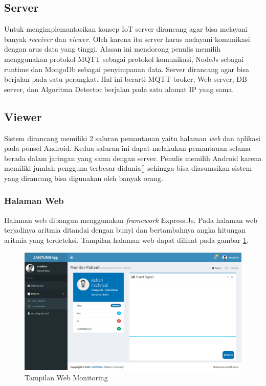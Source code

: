 \subsection{Server}
Untuk mengimplemantasikan konsep IoT server dirancang agar bisa melayani banyak \textit{receiver} dan \textit{viewer}. Oleh karena itu server harus melayani komunikasi dengan arus data yang tinggi. Alasan ini mendorong penulis memilih menggunakan protokol MQTT sebagai protokol komunikasi, NodeJs sebagai runtime dan MongoDb sebagai penyimpanan data. Server dirancang agar bisa berjalan pada satu perangkat. Hal ini berarti MQTT broker, Web server, DB server, dan Algoritma Detector berjalan pada satu alamat IP yang sama. 

\subsection{Viewer}
Sistem dirancang memiliki 2 saluran pemantauan yaitu halaman \textit{web} dan aplikasi pada ponsel Android. Kedua saluran ini dapat melakukan pemantauan selama berada dalam jaringan yang sama dengan server. Penulis memilih Android karena memiliki jumlah pengguna terbesar didunia[] sehingga bisa diasumsikan sistem yang dirancang bisa digunakan oleh banyak orang.

\subsubsection{Halaman Web}
Halaman web dibangun menggunakan \textit{framework} Express.Js. Pada halaman web terjadinya aritmia ditandai dengan bunyi dan bertambahnya angka hitungan aritmia yang terdeteksi. Tampilan halaman web dapat dilihat pada gambar \ref{web_app}.

\begin{figure}[H]
	\centering
	\includegraphics[scale=0.3]{images/web_app.png}
	\caption{Tampilan Web Monitoring}
	\label{web_app}
\end{figure}

